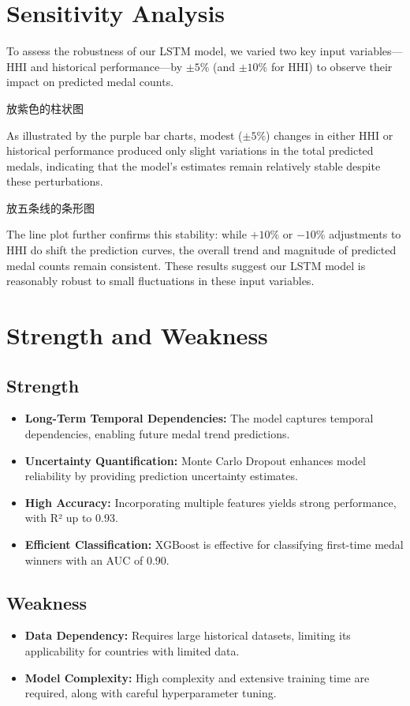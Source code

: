 \documentclass{mcmthesis}
\begin{document}
	
	
\section{Sensitivity Analysis}
To assess the robustness of our LSTM model, we varied two key input variables—HHI and historical performance—by $\pm5\%$ (and $\pm10\%$ for HHI) to observe their impact on predicted medal counts. 

放紫色的柱状图

As illustrated by the purple bar charts, modest ($\pm5\%$) changes in either HHI or historical performance produced only slight variations in the total predicted medals, indicating that the model’s estimates remain relatively stable despite these perturbations. 

放五条线的条形图

The line plot further confirms this stability: while $+10\%$ or $-10\%$ adjustments to HHI do shift the prediction curves, the overall trend and magnitude of predicted medal counts remain consistent. These results suggest our LSTM model is reasonably robust to small fluctuations in these input variables.
	
\section{Strength and Weakness}


\subsection{Strength}
\begin{itemize}[leftmargin=0.15in, labelsep=0.1in, itemsep=10pt, parsep=5pt]
	\item \textbf{Long-Term Temporal Dependencies:} The model captures temporal dependencies, enabling future medal trend predictions.
	\item \textbf{Uncertainty Quantification:} Monte Carlo Dropout enhances model reliability by providing prediction uncertainty estimates.
	\item \textbf{High Accuracy:} Incorporating multiple features yields strong performance, with R² up to 0.93.
	\item \textbf{Efficient Classification:} XGBoost is effective for classifying first-time medal winners with an AUC of 0.90.
\end{itemize}

\subsection{Weakness}
\begin{itemize}[leftmargin=0.15in, labelsep=0.1in, itemsep=10pt, parsep=5pt]
	\item \textbf{Data Dependency:} Requires large historical datasets, limiting its applicability for countries with limited data.
	\item \textbf{Model Complexity:} High complexity and extensive training time are required, along with careful hyperparameter tuning.
\end{itemize}
\end{document}
